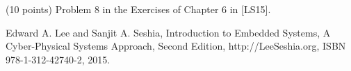 \documentclass[a4paper, 12pt]{article}
\begin{document}
\newpage
\begin{problem}{}
(10 points) Problem 8 in the Exercises of Chapter 6 in [LS15].

\noindent
[LS15] Edward A. Lee and Sanjit A. Seshia, Introduction to Embedded Systems, A Cyber-Physical Systems Approach, Second Edition, http://LeeSeshia.org, ISBN 978-1-312-42740-2, 2015. \\
\\
\begin{minipage}{1\textwidth}
		\rectangle{\linewidth}{23cm}
\end{minipage}
\newpage
\ \\
\begin{minipage}{1\textwidth}
		\rectangle{\linewidth}{24cm}
\end{minipage}
\newpage
\ \\
\begin{minipage}{1\textwidth}
		\rectangle{\linewidth}{24cm}
\end{minipage}
\newpage
\ \\
\begin{minipage}{1\textwidth}
		\rectangle{\linewidth}{24cm}
\end{minipage}
\end{problem}
\end{document}
